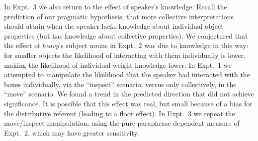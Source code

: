 \documentclass[linguex]{sp}
\begin{document}
In Expt.~3 we also return to the effect of speaker's knowledge. Recall the prediction of our pragmatic hypothesis, that more collective interpretations should attain when the speaker lacks knowledge about individual object properties (but has knowledge about collective properties). We conjectured that the effect of \emph{heavy}'s subject nouns in Expt.~2 was due to knowledge in this way: for smaller objects the likelihood of interacting with them individually is lower, making the likelihood of individual weight knowledge lower.
In Expt.~1 we attempted to manipulate the likelihood that the speaker had interacted with the boxes individually, via the ``inspect'' scenario, versus only collectively, in the ``move'' scenario. We found a trend in the predicted direction that did not achieve significance.
It is possible that this effect was real, but small because of a bias for the distributive referent (leading to a floor effect).
In Expt.~3 we repeat the move/inspect manipulation, using the pure paraphrase dependent measure of Expt.~2, which may have greater sensitivity.

%
%
%
\end{document}

